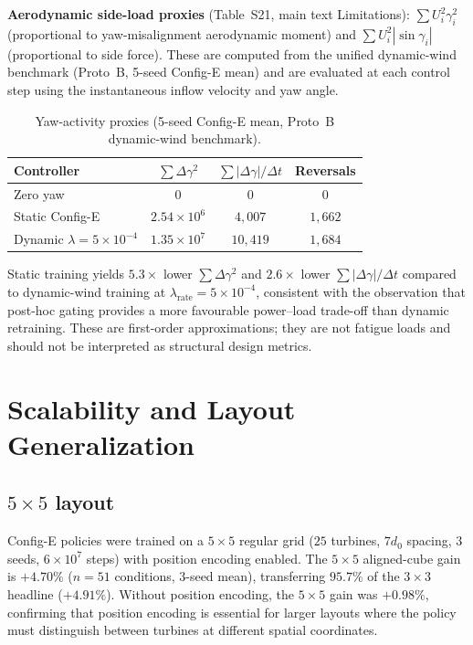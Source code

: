 \documentclass{article}
\begin{document}
\textbf{Aerodynamic side-load proxies} (Table~S21, main text Limitations): $\sum U_i^2\gamma_i^2$ (proportional to yaw-misalignment aerodynamic moment) and $\sum U_i^2|\sin\gamma_i|$ (proportional to side force). These are computed from the unified dynamic-wind benchmark (Proto~B, 5-seed Config-E mean) and are evaluated at each control step using the instantaneous inflow velocity and yaw angle.

\begin{table}[h]
\centering
\caption{Yaw-activity proxies (5-seed Config-E mean, Proto~B dynamic-wind benchmark).}
\label{tab:yaw_proxy}
\small
\begin{tabular}{lccc}
\toprule
Controller & $\sum\Delta\gamma^2$ & $\sum|\Delta\gamma|/\Delta t$ & Reversals \\
\midrule
Zero yaw               & $0$                 & $0$      & $0$     \\
Static Config-E        & $2.54{\times}10^{6}$ & $4{,}007$ & $1{,}662$ \\
Dynamic $\lambda{=}5{\times}10^{-4}$ & $1.35{\times}10^{7}$ & $10{,}419$ & $1{,}684$ \\
\bottomrule
\end{tabular}
\end{table}

Static training yields $5.3{\times}$ lower $\sum\Delta\gamma^2$ and $2.6{\times}$ lower $\sum|\Delta\gamma|/\Delta t$ compared to dynamic-wind training at $\lambda_\mathrm{rate}{=}5{\times}10^{-4}$, consistent with the observation that post-hoc gating provides a more favourable power--load trade-off than dynamic retraining. These are first-order approximations; they are not fatigue loads and should not be interpreted as structural design metrics.

\section{Scalability and Layout Generalization}\label{sec:scale}

\subsection{$5{\times}5$ layout}

Config-E policies were trained on a $5{\times}5$ regular grid ($25$ turbines, $7d_0$ spacing, $3$ seeds, $6{\times}10^{7}$ steps) with position encoding enabled. The $5{\times}5$ aligned-cube gain is $+4.70\%$ ($n{=}51$ conditions, 3-seed mean), transferring $95.7\%$ of the $3{\times}3$ headline ($+4.91\%$). Without position encoding, the $5{\times}5$ gain was $+0.98\%$, confirming that position encoding is essential for larger layouts where the policy must distinguish between turbines at different spatial coordinates.
\end{document}
